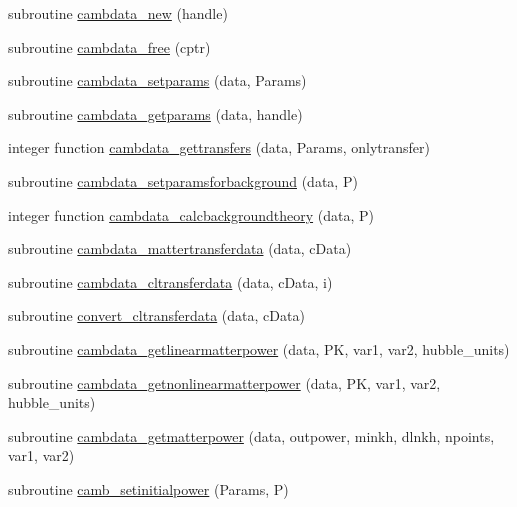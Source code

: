 \begin{DoxyCompactItemize}
\item 
subroutine \mbox{\hyperlink{namespacehandles_a4de5423ef5a8e284a0571c62a0144917}{cambdata\+\_\+new}} (handle)
\item 
subroutine \mbox{\hyperlink{namespacehandles_ab179d576d5e788ddc19e8a8c841aeade}{cambdata\+\_\+free}} (cptr)
\item 
subroutine \mbox{\hyperlink{namespacehandles_a133fee834b72f96e030cb55f3c47d961}{cambdata\+\_\+setparams}} (data, Params)
\item 
subroutine \mbox{\hyperlink{namespacehandles_a564998825329a378540701dda7e31957}{cambdata\+\_\+getparams}} (data, handle)
\item 
integer function \mbox{\hyperlink{namespacehandles_a386ee0a28e6860d14047f052c918ca43}{cambdata\+\_\+gettransfers}} (data, Params, onlytransfer)
\item 
subroutine \mbox{\hyperlink{namespacehandles_a4bdaf08397a5abc493ea901b3a53ece5}{cambdata\+\_\+setparamsforbackground}} (data, P)
\item 
integer function \mbox{\hyperlink{namespacehandles_a2c10aa9ff66a25677588584f3fc4f2a3}{cambdata\+\_\+calcbackgroundtheory}} (data, P)
\item 
subroutine \mbox{\hyperlink{namespacehandles_a98c230a0efe726b878c7efc4e95f6574}{cambdata\+\_\+mattertransferdata}} (data, c\+Data)
\item 
subroutine \mbox{\hyperlink{namespacehandles_ab0bb10def620b06fb617f4704d9342d9}{cambdata\+\_\+cltransferdata}} (data, c\+Data, i)
\item 
subroutine \mbox{\hyperlink{namespacehandles_abfc0adee06cc42379adb5fee674a9611}{convert\+\_\+cltransferdata}} (data, c\+Data)
\item 
subroutine \mbox{\hyperlink{namespacehandles_accd4416ff2222813d3f9784504d7e5d8}{cambdata\+\_\+getlinearmatterpower}} (data, PK, var1, var2, hubble\+\_\+units)
\item 
subroutine \mbox{\hyperlink{namespacehandles_a26542fd10068a2b3d57617a97f935286}{cambdata\+\_\+getnonlinearmatterpower}} (data, PK, var1, var2, hubble\+\_\+units)
\item 
subroutine \mbox{\hyperlink{namespacehandles_a77db4a8f3a15895102aa6f7c7e49d5f8}{cambdata\+\_\+getmatterpower}} (data, outpower, minkh, dlnkh, npoints, var1, var2)
\item 
subroutine \mbox{\hyperlink{namespacehandles_a8cc3e1b0936fd89aca15f4cead25ad9c}{camb\+\_\+setinitialpower}} (Params, P)
\item 

\end{DoxyCompactItemize}
